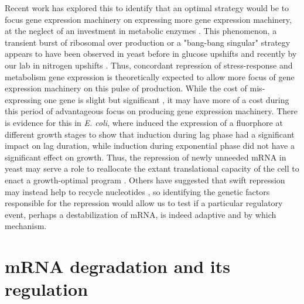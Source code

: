 Recent work has explored this to identify that an optimal strategy
would be to focus gene expression machinery on expressing more gene 
expression machinery, at the neglect of an investment in metabolic
enzymes \parencite{giordano2016dynamical}. 
This phenomenon, a transient burst of ribosomal over production or a
"bang-bang singular" strategy appears to have been observed in
yeast before in glucose upshifts \parencite{griffioen1996ribosomal} 
and recently by our lab in nitrogen upshifts 
\parencite{airoldi2016steady}.
Thus, concordant repression of stress-response and
metabolism gene expression is theoretically expected to allow more
focus of gene expression machinery on this pulse of production.
While the cost of mis-expressing one gene is slight but significant
\parencite{kafri2016cost}, it may have more of a cost during this
period of advantageous focus on producing gene expression machinery.
There is evidence for this in \textit{E. coli}, where
\cite{shachrai2010cost} induced the expression of a fluorphore at
different growth stages to show that induction during lag phase 
had a significant impact on lag duration, while induction during
exponential phase did not have a significant effect on growth.
Thus, the repression of newly unneeded mRNA in yeast may serve a 
role to reallocate the extant translational
capacity of the cell to enact a growth-optimal program 
\parencite{kief1981coordinate}. 
Others have suggested that swift repression may instead
help to recycle nucleotides \parencite{kresnowati2006transcriptome},
so identifying the genetic factors responsible for the repression 
would allow us to test if a particular regulatory event,
perhaps a destabilization of mRNA, is indeed adaptive and by which
mechanism.

\section{mRNA degradation and its regulation}

